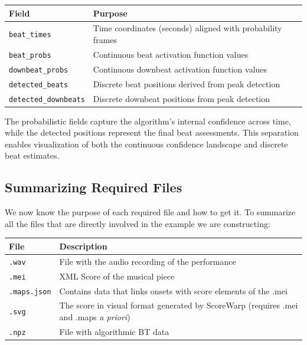 \begin{table}[h]
\centering
\begin{tabular}{ll}
\hline
\textbf{Field} & \textbf{Purpose} \\
\hline
\texttt{beat\_times} & Time coordinates (seconds) aligned with probability frames \\
\texttt{beat\_probs} & Continuous beat activation function values \\
\texttt{downbeat\_probs} & Continuous downbeat activation function values \\
\texttt{detected\_beats} & Discrete beat positions derived from peak detection \\
\texttt{detected\_downbeats} & Discrete downbeat positions from peak detection \\
\hline
\end{tabular}
\end{table}

The probabilistic fields capture the algorithm's internal confidence across time, while the detected positions represent the final beat assessments. This separation enables visualization of both the continuous confidence landscape and discrete beat estimates.

\subsection{Summarizing Required Files}
We now know the purpose of each required file and how to get it. To summarize all the files that are directly involved in the example we are constructing:

\begin{table}[h]
\centering
\begin{tabular}{ll}
\hline
\textbf{File} & \textbf{Description} \\
\hline
\texttt{.wav} &  File with the audio recording of the performance \\
\texttt{.mei} &  XML Score of the musical piece\\
\texttt{.maps.json} &  Contains data that links onsets with score elements of the .mei\\
\texttt{.svg} &  The score in visual format generated by ScoreWarp (requires .mei and .maps \textit{a priori})\\
\texttt{.npz} &  File with algorithmic BT data\\
\hline
\end{tabular}
\end{table}

